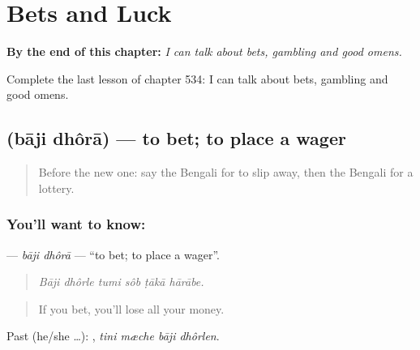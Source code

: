 
\chapter{Bets and Luck}
\label{ch:bn-bets-and-luck}

\begin{chapteropening}
\textbf{By the end of this chapter:} \emph{I can talk about bets, gambling and good omens.}

Complete the last lesson of chapter 534: I can talk about bets, gambling and good omens.
\end{chapteropening}

\section[\texorpdfstring{\bn{বাজি} \bn{ধরা} (bāji dhôrā)}{বাজি ধরা (bāji dhôrā)}]{  (bāji dhôrā) — to bet; to place a wager}

\label{lesson:BN-C534-baji-dhora}



\begin{quote}
Before the new one: say the Bengali for to slip away, then the Bengali for a lottery.
\end{quote}

\subsection*{You'll want to know:  }
\textbf{ } — \emph{bāji dhôrā} — \textquotedblleft{}to bet; to place a wager\textquotedblright{}.

\begin{quote}
     
\end{quote}

\begin{quote}
\emph{Bāji dhôrle tumi sôb ṭākā hārābe.}
\end{quote}

\begin{quote}
If you bet, you'll lose all your money.
\end{quote}

Past (he/she …):    , \emph{tini mæche bāji dhôrlen}.

